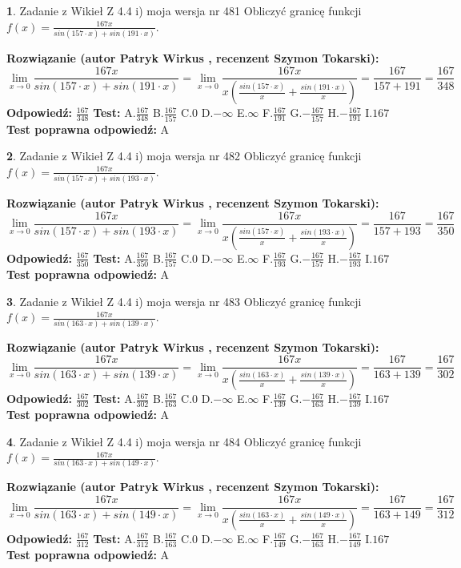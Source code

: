 \documentclass[12pt, a4paper]{article}
\theoremstyle{definition} %
\newtheorem{zad}{}
\newcommand{\zadStart}[1]{\begin{zad}#1\newline}
\newcommand{\zadStop}{\end{zad}}
\newcommand{\rozwStart}[2]{\noindent \textbf{Rozwiązanie (autor #1 , recenzent #2): }\newline}
\newcommand{\rozwStop}{\newline}
\newcommand{\odpStart}{\noindent \textbf{Odpowiedź:}\newline}
\newcommand{\odpStop}{\newline}
\newcommand{\testStart}{\noindent \textbf{Test:}\newline}
\newcommand{\testStop}{\newline}
\newcommand{\kluczStart}{\noindent \textbf{Test poprawna odpowiedź:}\newline}
\newcommand{\kluczStop}{\newline}
\begin{document}
\zadStart{Zadanie z Wikieł Z 4.4 i) moja wersja nr 481}
Obliczyć granicę funkcji $f(x)=\frac{167x}{sin(157\cdot x) +sin(191\cdot x)}$.
\zadStop
\rozwStart{Patryk Wirkus}{Szymon Tokarski}
$$\lim\limits_{x\to 0}\frac{167x}{sin(157\cdot x) +sin(191\cdot x)}=\lim\limits_{x\to 0}\frac{167x}{x(\frac{sin(157\cdot x)}{x}+\frac{sin(191\cdot x)}{x})}=\frac{167}{157+191} = \frac{167}{348}$$
\rozwStop
\odpStart
$\frac{167}{348}$
\odpStop
\testStart
A.$\frac{167}{348}$
B.$\frac{167}{157}$
C.$0$
D.$-\infty$
E.$\infty$
F.$\frac{167}{191}$
G.$-\frac{167}{157}$
H.$-\frac{167}{191}$
I.$167$
\testStop
\kluczStart
A
\kluczStop



\zadStart{Zadanie z Wikieł Z 4.4 i) moja wersja nr 482}
Obliczyć granicę funkcji $f(x)=\frac{167x}{sin(157\cdot x) +sin(193\cdot x)}$.
\zadStop
\rozwStart{Patryk Wirkus}{Szymon Tokarski}
$$\lim\limits_{x\to 0}\frac{167x}{sin(157\cdot x) +sin(193\cdot x)}=\lim\limits_{x\to 0}\frac{167x}{x(\frac{sin(157\cdot x)}{x}+\frac{sin(193\cdot x)}{x})}=\frac{167}{157+193} = \frac{167}{350}$$
\rozwStop
\odpStart
$\frac{167}{350}$
\odpStop
\testStart
A.$\frac{167}{350}$
B.$\frac{167}{157}$
C.$0$
D.$-\infty$
E.$\infty$
F.$\frac{167}{193}$
G.$-\frac{167}{157}$
H.$-\frac{167}{193}$
I.$167$
\testStop
\kluczStart
A
\kluczStop



\zadStart{Zadanie z Wikieł Z 4.4 i) moja wersja nr 483}
Obliczyć granicę funkcji $f(x)=\frac{167x}{sin(163\cdot x) +sin(139\cdot x)}$.
\zadStop
\rozwStart{Patryk Wirkus}{Szymon Tokarski}
$$\lim\limits_{x\to 0}\frac{167x}{sin(163\cdot x) +sin(139\cdot x)}=\lim\limits_{x\to 0}\frac{167x}{x(\frac{sin(163\cdot x)}{x}+\frac{sin(139\cdot x)}{x})}=\frac{167}{163+139} = \frac{167}{302}$$
\rozwStop
\odpStart
$\frac{167}{302}$
\odpStop
\testStart
A.$\frac{167}{302}$
B.$\frac{167}{163}$
C.$0$
D.$-\infty$
E.$\infty$
F.$\frac{167}{139}$
G.$-\frac{167}{163}$
H.$-\frac{167}{139}$
I.$167$
\testStop
\kluczStart
A
\kluczStop



\zadStart{Zadanie z Wikieł Z 4.4 i) moja wersja nr 484}
Obliczyć granicę funkcji $f(x)=\frac{167x}{sin(163\cdot x) +sin(149\cdot x)}$.
\zadStop
\rozwStart{Patryk Wirkus}{Szymon Tokarski}
$$\lim\limits_{x\to 0}\frac{167x}{sin(163\cdot x) +sin(149\cdot x)}=\lim\limits_{x\to 0}\frac{167x}{x(\frac{sin(163\cdot x)}{x}+\frac{sin(149\cdot x)}{x})}=\frac{167}{163+149} = \frac{167}{312}$$
\rozwStop
\odpStart
$\frac{167}{312}$
\odpStop
\testStart
A.$\frac{167}{312}$
B.$\frac{167}{163}$
C.$0$
D.$-\infty$
E.$\infty$
F.$\frac{167}{149}$
G.$-\frac{167}{163}$
H.$-\frac{167}{149}$
I.$167$
\testStop
\kluczStart
A
\kluczStop
\end{document}
